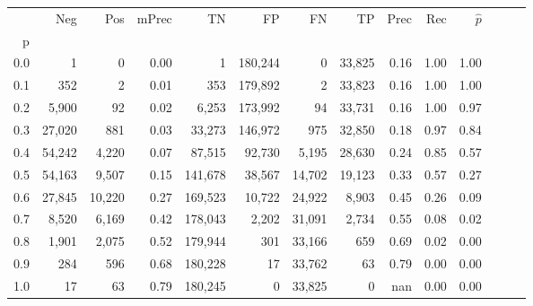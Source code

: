 \begin{tabular}{rrrrrrrrrrrrrr}
\toprule
{} &     Neg &     Pos & mPrec &       TN &       FP &      FN &      TP &  Prec &   Rec & $\hat{p}$ \\
p   &         &         &       &          &          &         &         &       &       &           \\
\midrule
0.0 &       1 &       0 &  0.00 &        1 &  180,244 &       0 &  33,825 &  0.16 &  1.00 &      1.00 \\
0.1 &     352 &       2 &  0.01 &      353 &  179,892 &       2 &  33,823 &  0.16 &  1.00 &      1.00 \\
0.2 &   5,900 &      92 &  0.02 &    6,253 &  173,992 &      94 &  33,731 &  0.16 &  1.00 &      0.97 \\
0.3 &  27,020 &     881 &  0.03 &   33,273 &  146,972 &     975 &  32,850 &  0.18 &  0.97 &      0.84 \\
0.4 &  54,242 &   4,220 &  0.07 &   87,515 &   92,730 &   5,195 &  28,630 &  0.24 &  0.85 &      0.57 \\
0.5 &  54,163 &   9,507 &  0.15 &  141,678 &   38,567 &  14,702 &  19,123 &  0.33 &  0.57 &      0.27 \\
0.6 &  27,845 &  10,220 &  0.27 &  169,523 &   10,722 &  24,922 &   8,903 &  0.45 &  0.26 &      0.09 \\
0.7 &   8,520 &   6,169 &  0.42 &  178,043 &    2,202 &  31,091 &   2,734 &  0.55 &  0.08 &      0.02 \\
0.8 &   1,901 &   2,075 &  0.52 &  179,944 &      301 &  33,166 &     659 &  0.69 &  0.02 &      0.00 \\
0.9 &     284 &     596 &  0.68 &  180,228 &       17 &  33,762 &      63 &  0.79 &  0.00 &      0.00 \\
1.0 &      17 &      63 &  0.79 &  180,245 &        0 &  33,825 &       0 &   nan &  0.00 &      0.00 \\
\bottomrule
\end{tabular}
